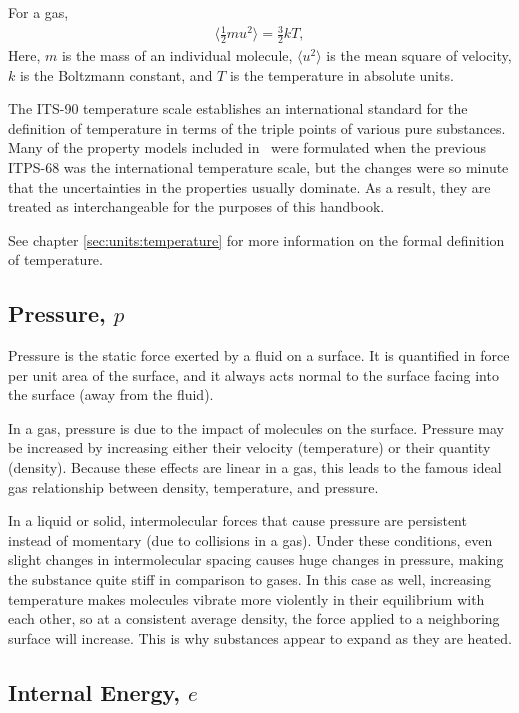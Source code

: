For a gas,
\begin{align}
\langle \frac{1}{2} m u^2 \rangle = \frac{3}{2} k T,
\end{align}
Here, $m$ is the mass of an individual molecule, $\langle u^2 \rangle$ is the mean square of velocity, $k$ is the Boltzmann constant, and $T$ is the temperature in absolute units.

The ITS-90 temperature scale establishes an international standard for the definition of temperature in terms of the triple points of various pure substances.  Many of the property models included in \PM\ were formulated when the previous ITPS-68 was the international temperature scale, but the changes were so minute that the uncertainties in the properties usually dominate\cite[p.10]{janaf:1:1998}.  As a result, they are treated as interchangeable for the purposes of this handbook.

See chapter \ref{sec:units:temperature} for more information on the formal definition of temperature.

\subsection{Pressure, $p$}\label{sec:intro:p}

Pressure is the static force exerted by a fluid on a surface.  It is quantified in force per unit area of the surface, and it always acts normal to the surface facing into the surface (away from the fluid).  

In a gas, pressure is due to the impact of molecules on the surface.  Pressure may be increased by increasing either their velocity (temperature) or their quantity (density).  Because these effects are linear in a gas, this leads to the famous ideal gas relationship between density, temperature, and pressure.  

In a liquid or solid, intermolecular forces that cause pressure are persistent instead of momentary (due to collisions in a gas).  Under these conditions, even slight changes in intermolecular spacing causes huge changes in pressure, making the substance quite stiff in comparison to gases.  In this case as well, increasing temperature makes molecules vibrate more violently in their equilibrium with each other, so at a consistent average density, the force applied to a neighboring surface will increase.  This is why substances appear to expand as they are heated.

\subsection{Internal Energy, $e$}\label{sec:intro:e}

